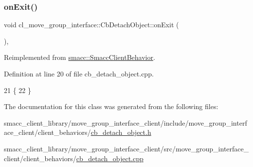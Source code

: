 \subsubsection{\texorpdfstring{on\+Exit()}{onExit()}}
{\footnotesize\ttfamily void cl\+\_\+move\+\_\+group\+\_\+interface\+::\+Cb\+Detach\+Object\+::on\+Exit (\begin{DoxyParamCaption}{ }\end{DoxyParamCaption})\hspace{0.3cm}{\ttfamily [override]}, {\ttfamily [virtual]}}



Reimplemented from \hyperlink{classsmacc_1_1SmaccClientBehavior_a7e4fb6ce81ff96dc172425852d69c0c5}{smacc\+::\+Smacc\+Client\+Behavior}.



Definition at line 20 of file cb\+\_\+detach\+\_\+object.\+cpp.


\begin{DoxyCode}
21     \{
22     \}
\end{DoxyCode}


The documentation for this class was generated from the following files\+:\begin{DoxyCompactItemize}
\item 
smacc\+\_\+client\+\_\+library/move\+\_\+group\+\_\+interface\+\_\+client/include/move\+\_\+group\+\_\+interface\+\_\+client/client\+\_\+behaviors/\hyperlink{cb__detach__object_8h}{cb\+\_\+detach\+\_\+object.\+h}\item 
smacc\+\_\+client\+\_\+library/move\+\_\+group\+\_\+interface\+\_\+client/src/move\+\_\+group\+\_\+interface\+\_\+client/client\+\_\+behaviors/\hyperlink{cb__detach__object_8cpp}{cb\+\_\+detach\+\_\+object.\+cpp}\end{DoxyCompactItemize}
